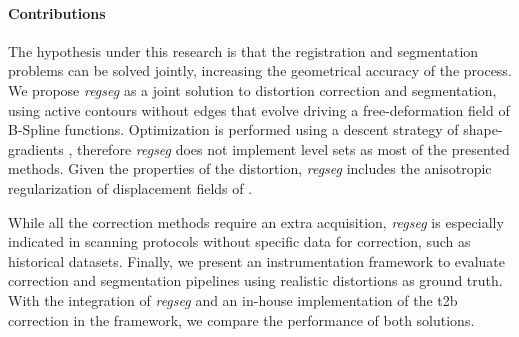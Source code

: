 \paragraph{Contributions}\label{sec:contributions}
The hypothesis under this research is that the registration and segmentation
  problems can be solved jointly, increasing the geometrical accuracy of the process.
We propose \emph{regseg} as a joint solution to distortion correction and segmentation,
  using active contours without edges \citep{chan_active_2001} that evolve driving a
  free-deformation field of B-Spline functions.
Optimization is performed using a descent strategy of shape-gradients
  \citep{herbulot_segmentation_2006,besson_dream2s_2003}, therefore \emph{regseg}
  does not implement level sets as most of the presented methods.
Given the properties of the distortion, \emph{regseg} includes the anisotropic regularization
  of displacement fields of \cite{nagel_investigation_1986}.

While all the correction methods require an extra acquisition, \emph{regseg} is especially
  indicated in scanning protocols without specific data for correction,
  such as historical datasets.
Finally, we present an instrumentation framework to evaluate correction and
  segmentation pipelines using realistic distortions as ground truth.
With the integration of \emph{regseg} and an in-house implementation of the 
  \gls*{t2b} correction in the framework, we compare the performance
  of both solutions.
